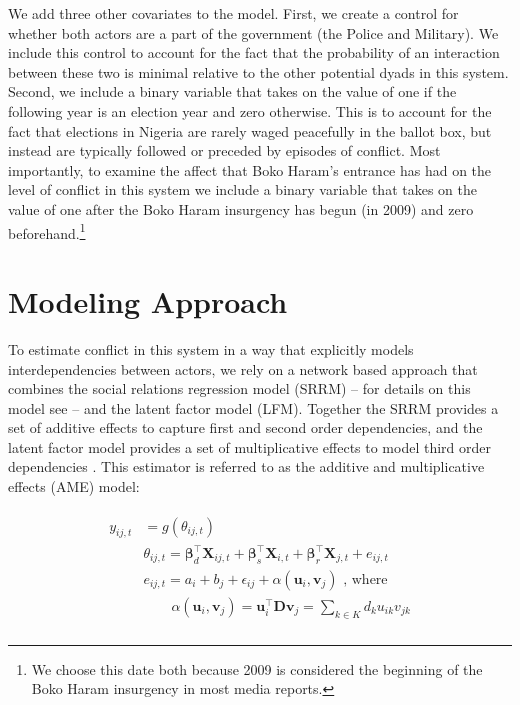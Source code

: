 We add three other covariates to the model. First, we create a control for whether both actors are a part of the government (the Police and Military). We include this control to account for the fact that the probability of an interaction between these two is minimal relative to the other potential dyads in this system. Second, we include a binary variable that takes on the value of one if the following year is an election year and zero otherwise. This is to account for the fact that elections in Nigeria are rarely waged peacefully in the ballot box, but instead are typically followed or preceded by episodes of conflict. Most importantly, to examine the affect that Boko Haram's entrance has had on the level of conflict in this system we include a binary variable that takes on the value of one after the Boko Haram insurgency has begun (in 2009) and zero beforehand.\footnote{We choose this date both because 2009 is considered the beginning of the Boko Haram insurgency in most media reports.}

\section*{Modeling Approach}

To estimate conflict in this system in a way that explicitly models interdependencies between actors, we rely on a network based approach that combines the social relations regression model (SRRM) -- for details on this model see \citet{dorff:minhas:2017} -- and the latent factor model (LFM). Together the SRRM provides a set of additive effects to capture first and second order dependencies, and the latent factor model provides a set of multiplicative effects to model third order dependencies \citep{minhas:etal:2016:arxiv}. This estimator is referred to as the additive and multiplicative effects (AME) model:

\vspace{-10mm}
\begin{align}
	\begin{aligned}
		y_{ij,t} &= g(\theta_{ij,t}) \\ 
		&\theta_{ij,t} = \bm\beta_{d}^{\top} \mathbf{X}_{ij,t} + \bm\beta_{s}^{\top} \mathbf{X}_{i,t} + \bm\beta_{r}^{\top} \mathbf{X}_{j,t} + e_{ij,t} \\
		&e_{ij,t} = a_{i} + b_{j}  + \epsilon_{ij} + \alpha(\textbf{u}_{i}, \textbf{v}_{j}) \text{  , where } \\
		&\qquad \alpha(\textbf{u}_{i}, \textbf{v}_{j}) = \textbf{u}_{i}^{\top} \textbf{D} \textbf{v}_{j} = \sum_{k \in K} d_{k} u_{ik} v_{jk} \\ 
	\label{eqn:ame}
	\end{aligned}
\end{align}

